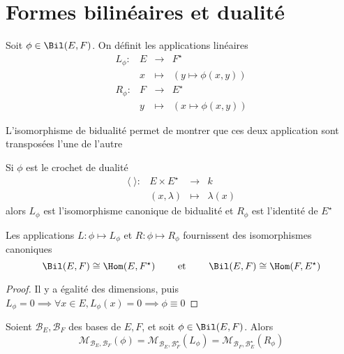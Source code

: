 \section{Formes bilinéaires et dualité}

\begin{dfn}
    Soit $\phi \in  \Bil(E, F)$. On définit les applications linéaires \[
    \begin{array}{rrcl}
        L_\phi:& E & \longrightarrow &F^\star  \\
               & x & \longmapsto & \displaystyle (y \longmapsto \phi(x, y))\\
        R_\phi:& F & \longrightarrow &E^\star  \\
               & y & \longmapsto & \displaystyle (x \longmapsto \phi(x, y))
    \end{array}
    \] 
\end{dfn}

\begin{rem}
L'isomorphisme de bidualité permet de montrer que ces deux application sont transposées l'une de l'autre
\end{rem}

\begin{ex}
Si $\phi$ est le crochet de dualité \[
\begin{array}{rrcl}
    \langle \;\rangle:& E\times E^\star & \longrightarrow & k \\
                      & (x, \lambda) & \longmapsto & \displaystyle \lambda(x)
\end{array}
\] 
alors $L_\phi$ est l'isomorphisme canonique de bidualité et  $R_\phi$ est l'identité de  $E^\star$
\end{ex}

\begin{prop}
    Les applications $L:\phi \longmapsto L_\phi$ et $R:\phi \longmapsto R_\phi$ fournissent des isomorphismes canoniques \[
        \Bil(E, F)\cong \Hom(E, F^\star) \qquad \text{ et }\qquad \Bil(E, F)\cong \Hom(F, E^\star)
    \] 
\end{prop}

\begin{proof}
    Il y a égalité des dimensions, puis $L_\phi=0 \implies \forall  x \in E, L_\phi(x)=0 \implies \phi\equiv 0$
\end{proof}

\begin{prop}
    Soient $\mathcal  B_E, \mathcal  B_F$ des bases de $E, F$, et soit  $ \phi \in \Bil(E, F)$. Alors \[
        \mathcal  M_{\mathcal  B_E, \mathcal  B_F}(\phi)=\mathcal  M_{\mathcal  B_E, \mathcal  B_F^\star}(L_\phi)=\mathcal M_{\mathcal  B_F, \mathcal  B_E^\star}(R_\phi)
    \] 
\end{prop}

